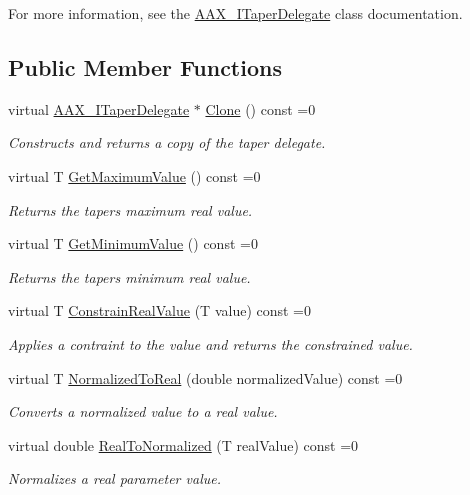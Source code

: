 For more information, see the \mbox{\hyperlink{a01881}{A\+A\+X\+\_\+\+I\+Taper\+Delegate}} class documentation. \subsection*{Public Member Functions}
\begin{DoxyCompactItemize}
\item 
virtual \mbox{\hyperlink{a01881}{A\+A\+X\+\_\+\+I\+Taper\+Delegate}} $\ast$ \mbox{\hyperlink{a01881_a80ce054ca716147155fe0682adf4e469}{Clone}} () const =0
\begin{DoxyCompactList}\small\item\em Constructs and returns a copy of the taper delegate. \end{DoxyCompactList}\item 
virtual T \mbox{\hyperlink{a01881_a9b14f7d73d614b6c012ed03fadb9f0eb}{Get\+Maximum\+Value}} () const =0
\begin{DoxyCompactList}\small\item\em Returns the taper\textquotesingle{}s maximum real value. \end{DoxyCompactList}\item 
virtual T \mbox{\hyperlink{a01881_ac51bda25adc6f4ce320c0dd41fa332c7}{Get\+Minimum\+Value}} () const =0
\begin{DoxyCompactList}\small\item\em Returns the taper\textquotesingle{}s minimum real value. \end{DoxyCompactList}\item 
virtual T \mbox{\hyperlink{a01881_a1de7acdc2b3e114b6686bf845c2465f1}{Constrain\+Real\+Value}} (T value) const =0
\begin{DoxyCompactList}\small\item\em Applies a contraint to the value and returns the constrained value. \end{DoxyCompactList}\item 
virtual T \mbox{\hyperlink{a01881_a0aea0765b42855205bfab84673a2de33}{Normalized\+To\+Real}} (double normalized\+Value) const =0
\begin{DoxyCompactList}\small\item\em Converts a normalized value to a real value. \end{DoxyCompactList}\item 
virtual double \mbox{\hyperlink{a01881_ab017fe7e1c1dcf6191f8b4e8b09f8add}{Real\+To\+Normalized}} (T real\+Value) const =0
\begin{DoxyCompactList}\small\item\em Normalizes a real parameter value. \end{DoxyCompactList}\end{DoxyCompactItemize}


